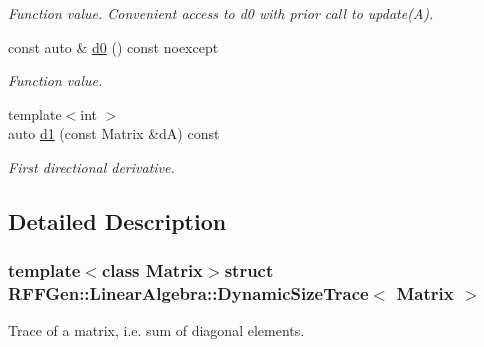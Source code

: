 \begin{DoxyCompactItemize}
\begin{DoxyCompactList}\small\item\em Function value. Convenient access to d0 with prior call to update(\-A). \end{DoxyCompactList}\item 
\hypertarget{structRFFGen_1_1LinearAlgebra_1_1DynamicSizeTrace_aaa657dd967d423cd15cc268033f68d36}{const auto \& \hyperlink{structRFFGen_1_1LinearAlgebra_1_1DynamicSizeTrace_aaa657dd967d423cd15cc268033f68d36}{d0} () const noexcept}\label{structRFFGen_1_1LinearAlgebra_1_1DynamicSizeTrace_aaa657dd967d423cd15cc268033f68d36}

\begin{DoxyCompactList}\small\item\em Function value. \end{DoxyCompactList}\item 
\hypertarget{structRFFGen_1_1LinearAlgebra_1_1DynamicSizeTrace_a1357c1190e2ce7e26cd67d178c226458}{{\footnotesize template$<$int $>$ }\\auto \hyperlink{structRFFGen_1_1LinearAlgebra_1_1DynamicSizeTrace_a1357c1190e2ce7e26cd67d178c226458}{d1} (const Matrix \&d\-A) const }\label{structRFFGen_1_1LinearAlgebra_1_1DynamicSizeTrace_a1357c1190e2ce7e26cd67d178c226458}

\begin{DoxyCompactList}\small\item\em First directional derivative. \end{DoxyCompactList}\end{DoxyCompactItemize}


\subsection{Detailed Description}
\subsubsection*{template$<$class Matrix$>$struct R\-F\-F\-Gen\-::\-Linear\-Algebra\-::\-Dynamic\-Size\-Trace$<$ Matrix $>$}

Trace of a matrix, i.\-e. sum of diagonal elements. 

